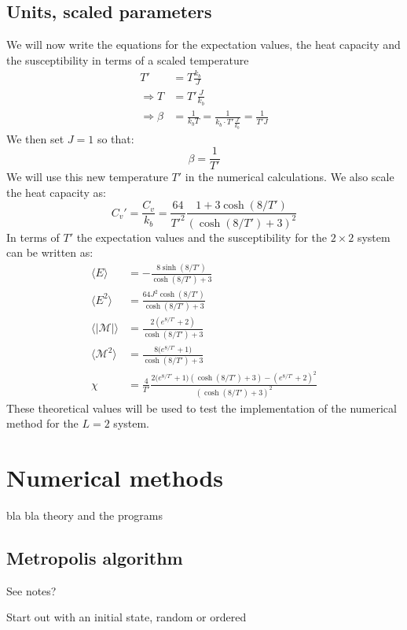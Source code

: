 \documentclass[11pt,a4wide]{article}
\begin{document}
\subsection{Units, scaled parameters}
We will now write the equations for the expectation values, the heat capacity and the susceptibility in terms of a scaled temperature
\begin{align*}
T' &= T \frac{k_b}{J} \\
\Rightarrow T &= T'\frac{J}{k_b}\\
\Rightarrow \beta &= \frac{1}{k_bT} = \frac{1}{k_b\cdot T'\frac{J}{k_b}} = \frac{1}{T'J}
\end{align*}
We then set $J=1$ so that:
\[
\beta = \frac{1}{T'}
\]
We will use this new temperature $T'$ in the numerical calculations. We also scale the heat capacity as:
\[
C_v' = \frac{C_v}{k_b} = \frac{64}{T'^2} \frac{1 + 3\cosh(8/T')}{(\cosh(8/T') + 3)^2} 
\]
In terms of $T'$ the expectation values and the susceptibility for the $2\times 2$ system can be written as:
\begin{align}
\langle E \rangle &= -\frac{8\sinh(8/T')}{\cosh(8/T') + 3} \\
\langle E^2 \rangle &=\frac{64J^2 \cosh(8/T')}{\cosh(8/T') + 3} \\
\langle |\mathcal{M}| \rangle &= \frac{2(e^{8/T'}+ 2)}{\cosh(8/T') + 3}\\
\langle \mathcal{M}^2 \rangle &= \frac{8\big(e^{8/T'} + 1\big)}{\cosh(8/T') + 3} \\
\chi &= \frac{4}{T'} \frac{2(e^{8/T'} + 1\big)(\cosh(8/T') + 3) - (e^{8/T'}+ 2)^2}{(\cosh(8/T') + 3)^2} 
\end{align}
These theoretical values will be used to test the implementation of the numerical method for the $L=2$ system. 


\section{Numerical methods}
bla bla theory and the programs
\subsection{Metropolis algorithm}
See notes?

Start out with an initial state, random or ordered
\end{document}
